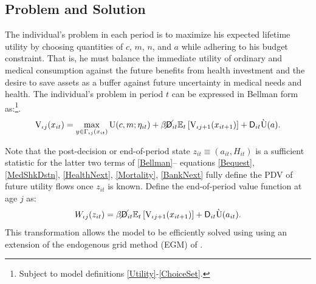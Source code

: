 \documentclass[12pt,pdftex,letterpaper]{article}
\newcommand{\E}{\mathbb{E}}
\newcommand{\PostHealth}{H}
\newcommand{\Utility}{\text{U}}
\newcommand{\Value}{\text{V}}
\newcommand{\PostValue}{W}
\newcommand{\Con}{c}
\newcommand{\Care}{m}
\newcommand{\Invst}{n}
\newcommand{\Assets}{a}
\newcommand{\DiscFac}{\beta}
\newcommand{\MedShk}{\eta}
\newcommand{\DiePrb}{\mathsf{D}}
\newcommand{\LivPrb}{\cancel{\DiePrb}}
\newcommand{\BudgetCorr}{\Gamma}
\newcommand{\State}{x}
\newcommand{\Control}{y}
\newcommand{\PostState}{z}
\begin{document}
\subsection{Problem and Solution}
\label{sec:Problem}

The individual's problem in each period is to maximize his expected lifetime utility by choosing quantities of $\Con$, $\Care$, $\Invst$, and $\Assets$ while adhering to his budget constraint.  That is, he must balance the immediate utility of ordinary and medical consumption against the future benefits from health investment and the desire to save assets as a buffer against future uncertainty in medical needs and health.  The individual's problem in period $t$ can be expressed in Bellman form as:\footnote{Subject to model definitions \eqref{Utility}-\eqref{ChoiceSet}.}.
\begin{equation}\label{Bellman}
\Value_{\iota j}(\State_{it}) = \max_{\Control \in \BudgetCorr_{\iota j}(\State_{it})} \Utility(\Con,\Care;\MedShk_{it}) + 
\DiscFac \LivPrb_{it} \E_t \left[ \Value_{\iota j+1}(\State_{it+1}) \right] + \DiePrb_{it} \grave{\Utility}(\Assets).
\end{equation}

Note that the post-decision or end-of-period state $\PostState_{it} \equiv (\Assets_{it},\PostHealth_{it})$ is a sufficient statistic for the latter two terms of \eqref{Bellman}-- equations \eqref{Bequest}, \eqref{MedShkDstn}, \eqref{HealthNext}, \eqref{Mortality}, \eqref{BankNext} fully define the PDV of future utility flows once $\PostState_{it}$ is known.  Define the end-of-period value function at age $j$ as:
\begin{equation}
\PostValue_{\iota j}(\PostState_{it}) = \DiscFac \LivPrb_{it} \E_t \left[ \Value_{\iota j+1}(\State_{it+1}) \right] + \DiePrb_{it} \grave{\Utility}(\Assets_{it}).
\end{equation}
This transformation allows the model to be efficiently solved using using an extension of the endogenous grid method (EGM) of \cite{Carroll06}.
\end{document}
